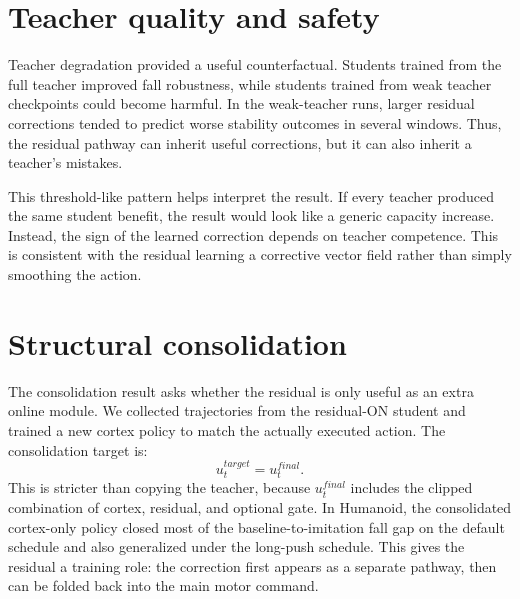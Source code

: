 \documentclass[11pt]{article}
\begin{document}
\begin{table}[h]
\centering
\small

\caption{Compact perturbation sanity checks.  Nonzero push/slip/sensor contrasts confirm that the perturbations were actually applied.}
\label{tab:sanity}
\end{table}

\section{Teacher quality and safety}
Teacher degradation provided a useful counterfactual.  Students trained from the full teacher improved fall robustness, while students trained from weak teacher checkpoints could become harmful.  In the weak-teacher runs, larger residual corrections tended to predict worse stability outcomes in several windows.  Thus, the residual pathway can inherit useful corrections, but it can also inherit a teacher's mistakes.

\begin{table}[h]
\centering
\small

\caption{Teacher-quality replication.  Negative fall deltas are helpful; positive fall deltas are harmful.}
\label{tab:teacher}
\end{table}

This threshold-like pattern helps interpret the result.  If every teacher produced the same student benefit, the result would look like a generic capacity increase.  Instead, the sign of the learned correction depends on teacher competence.  This is consistent with the residual learning a corrective vector field rather than simply smoothing the action.

\section{Structural consolidation}
The consolidation result asks whether the residual is only useful as an extra online module.  We collected trajectories from the residual-ON student and trained a new cortex policy to match the actually executed action.  The consolidation target is:
\[
u_t^{target} = u_t^{final}.
\]
This is stricter than copying the teacher, because $u_t^{final}$ includes the clipped combination of cortex, residual, and optional gate.  In Humanoid, the consolidated cortex-only policy closed most of the baseline-to-imitation fall gap on the default schedule and also generalized under the long-push schedule.  This gives the residual a training role: the correction first appears as a separate pathway, then can be folded back into the main motor command.
\end{document}
